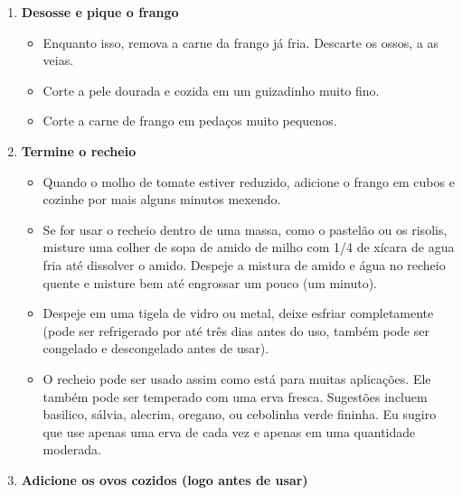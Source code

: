 \documentclass [11pt, letterpaper] {article}
\begin{document}
\begin {description}
\begin{enumerate}
\begin{itemize}
        \item Adicione a cebola picada e refogue por cinco minutos até a cebola começar a dorar.
        \item Adicione 1 colher de chá de mel \`a cebola e continue refogando até ficar bem dourada.
        \item Adicione a lata de tomates e o caldo de galinha reservado.
        \item Deixe cozinhar até que a maioria da água tenha evaporado e a gordura se separe do molho de tomate.
         \end{itemize}
 	\item{\bf Desosse e pique o frango}
	\begin{itemize}       
        \item Enquanto isso, remova a carne da frango j\'a fria. Descarte os ossos, a as veias. 
        \item Corte a pele dourada e cozida em um guizadinho muito fino.
        \item Corte a carne de frango em peda\c{c}os muito pequenos.
         \end{itemize}
 	\item{\bf Termine o recheio}
	\begin{itemize}      
	\item Quando o molho de tomate estiver reduzido, adicione o frango em cubos e cozinhe por mais alguns minutos mexendo.
	\item Se for usar o recheio dentro de uma massa, como o pastel\~ao ou os risolis, misture uma colher de sopa de amido de milho com 1/4 de x\'icara de agua fria at\'e dissolver o amido. Despeje a mistura de amido e \'agua no recheio quente e misture bem at\'e engrossar um pouco (um minuto).
        \item Despeje em uma tigela de vidro ou metal, deixe esfriar completamente (pode ser refrigerado por até três dias antes do uso, também pode ser congelado e descongelado antes de usar).
        \item O recheio pode ser usado assim como est\'a para muitas aplica\c{c}\~oes. Ele tamb\'em pode ser temperado com uma erva fresca. Sugest\~oes incluem basilico, s\'alvia, alecrim, oregano, ou cebolinha verde fininha. Eu sugiro que use apenas uma erva de cada vez e apenas em uma quantidade moderada.
         \end{itemize}
        \item {\bf Adicione os ovos cozidos (logo antes de usar)}
	\begin{itemize} 

\end{itemize}
\end{enumerate}
\end{description}
\end{document}
